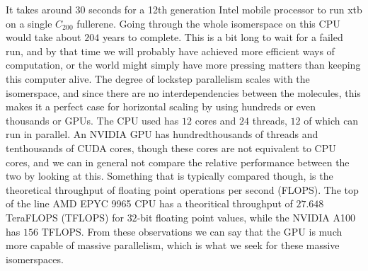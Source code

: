 It takes around $30$ seconds for a 12th generation Intel mobile processor to run xtb on a single $C_{200}$ fullerene. Going through the whole isomerspace on this CPU would take about $204$ years to complete. This is a bit long to wait for a failed run, and by that time we will probably have achieved more efficient ways of computation, or the world might simply have more pressing matters than keeping this computer alive. The degree of lockstep parallelism scales with the isomerspace, and since there are no interdependencies between the molecules, this makes it a perfect case for horizontal scaling by using hundreds or even thousands or GPUs. The CPU used has $12$ cores and $24$ threads, $12$ of which can run in parallel. An NVIDIA GPU has hundredthousands of threads and tenthousands of CUDA cores, though these cores are not equivalent to CPU cores, and we can in general not compare the relative performance between the two by looking at this. Something that is typically compared though, is the theoretical throughput of floating point operations per second (FLOPS). The top of the line AMD EPYC 9965 CPU has a theoritical throughput of $27.648$ TeraFLOPS (TFLOPS) for $32$-bit floating point values\cite{amd-epyc-performance}, while the NVIDIA A100 has $156$ TFLOPS\cite{nvidia-a100-architecture}. From these observations we can say that the GPU is much more capable of massive parallelism, which is what we seek for these massive isomerspaces.




